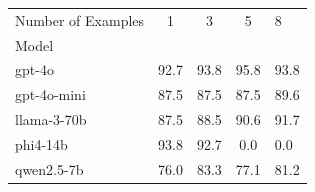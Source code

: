 \begin{table}
\label{tab:batch_2.0_stats}
\begin{tabular}{lccc}
\toprule
Number of Examples & 1 & 3 & 5 & 8 \\
Model &  &  &  &  \\
\midrule
gpt-4o & 92.7 & 93.8 & 95.8 & 93.8 \\
gpt-4o-mini & 87.5 & 87.5 & 87.5 & 89.6 \\
llama-3-70b & 87.5 & 88.5 & 90.6 & 91.7 \\
phi4-14b & 93.8 & 92.7 & 0.0 & 0.0 \\
qwen2.5-7b & 76.0 & 83.3 & 77.1 & 81.2 \\
\bottomrule
\end{tabular}
\end{table}
